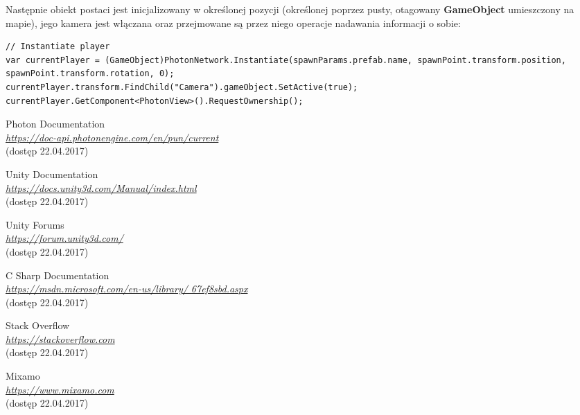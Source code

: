 \documentclass[openright]{xmgr}
\newcommand{\name}[1]{\textbf{\textcolor{NavyBlue}{#1}}}
\begin{document}
      Następnie obiekt postaci jest inicjalizowany w określonej pozycji (określonej poprzez pusty, otagowany \name{GameObject} umieszczony na mapie), jego kamera jest włączana oraz przejmowane są przez niego operacje nadawania informacji o sobie:

\begin{minipage}{\textwidth}
\begin{lstlisting}[caption={Algorytm inicjalizacji postaci gracza}]
// Instantiate player
var currentPlayer = (GameObject)PhotonNetwork.Instantiate(spawnParams.prefab.name, spawnPoint.transform.position, spawnPoint.transform.rotation, 0);
currentPlayer.transform.FindChild("Camera").gameObject.SetActive(true);
currentPlayer.GetComponent<PhotonView>().RequestOwnership();
\end{lstlisting}
\end{minipage}







\begin{thebibliography}{9}
Photon Documentation\\
\textit{\url{https://doc-api.photonengine.com/en/pun/current}}\\
(dostęp 22.04.2017)

Unity Documentation\\
\textit{\url{https://docs.unity3d.com/Manual/index.html}}\\
(dostęp 22.04.2017)

Unity Forums\\
\textit{\url{https://forum.unity3d.com/}}\\
(dostęp 22.04.2017)

C Sharp Documentation\\
\textit{\url{https://msdn.microsoft.com/en-us/library/
67ef8sbd.aspx}}\\
(dostęp 22.04.2017)

Stack Overflow\\
\textit{\url{https://stackoverflow.com}}\\
(dostęp 22.04.2017)

Mixamo\\
\textit{\url{https://www.mixamo.com}}\\
(dostęp 22.04.2017)
\end{thebibliography}
\end{document}
